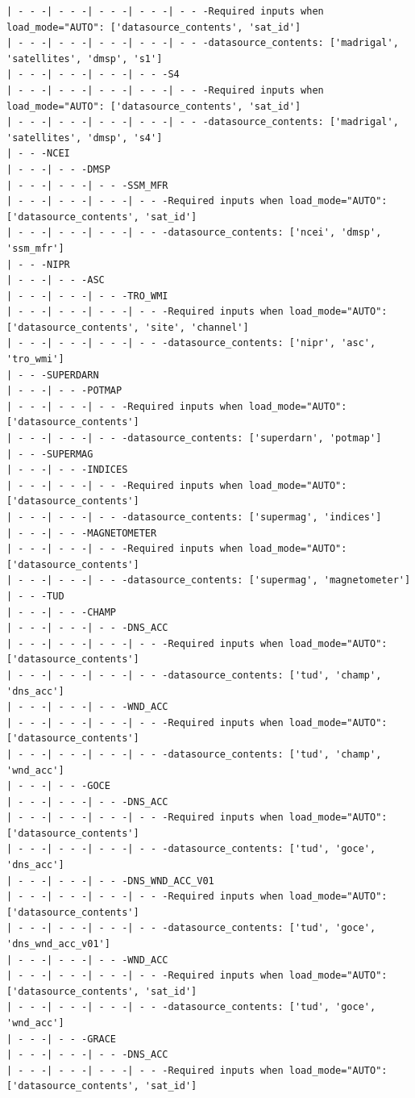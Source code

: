 \begin{verbatim}
| - - -| - - -| - - -| - - -| - - -Required inputs when load_mode="AUTO": ['datasource_contents', 'sat_id']
| - - -| - - -| - - -| - - -| - - -datasource_contents: ['madrigal', 'satellites', 'dmsp', 's1']
| - - -| - - -| - - -| - - -S4
| - - -| - - -| - - -| - - -| - - -Required inputs when load_mode="AUTO": ['datasource_contents', 'sat_id']
| - - -| - - -| - - -| - - -| - - -datasource_contents: ['madrigal', 'satellites', 'dmsp', 's4']
| - - -NCEI
| - - -| - - -DMSP
| - - -| - - -| - - -SSM_MFR
| - - -| - - -| - - -| - - -Required inputs when load_mode="AUTO": ['datasource_contents', 'sat_id']
| - - -| - - -| - - -| - - -datasource_contents: ['ncei', 'dmsp', 'ssm_mfr']
| - - -NIPR
| - - -| - - -ASC
| - - -| - - -| - - -TRO_WMI
| - - -| - - -| - - -| - - -Required inputs when load_mode="AUTO": ['datasource_contents', 'site', 'channel']
| - - -| - - -| - - -| - - -datasource_contents: ['nipr', 'asc', 'tro_wmi']
| - - -SUPERDARN
| - - -| - - -POTMAP
| - - -| - - -| - - -Required inputs when load_mode="AUTO": ['datasource_contents']
| - - -| - - -| - - -datasource_contents: ['superdarn', 'potmap']
| - - -SUPERMAG
| - - -| - - -INDICES
| - - -| - - -| - - -Required inputs when load_mode="AUTO": ['datasource_contents']
| - - -| - - -| - - -datasource_contents: ['supermag', 'indices']
| - - -| - - -MAGNETOMETER
| - - -| - - -| - - -Required inputs when load_mode="AUTO": ['datasource_contents']
| - - -| - - -| - - -datasource_contents: ['supermag', 'magnetometer']
| - - -TUD
| - - -| - - -CHAMP
| - - -| - - -| - - -DNS_ACC
| - - -| - - -| - - -| - - -Required inputs when load_mode="AUTO": ['datasource_contents']
| - - -| - - -| - - -| - - -datasource_contents: ['tud', 'champ', 'dns_acc']
| - - -| - - -| - - -WND_ACC
| - - -| - - -| - - -| - - -Required inputs when load_mode="AUTO": ['datasource_contents']
| - - -| - - -| - - -| - - -datasource_contents: ['tud', 'champ', 'wnd_acc']
| - - -| - - -GOCE
| - - -| - - -| - - -DNS_ACC
| - - -| - - -| - - -| - - -Required inputs when load_mode="AUTO": ['datasource_contents']
| - - -| - - -| - - -| - - -datasource_contents: ['tud', 'goce', 'dns_acc']
| - - -| - - -| - - -DNS_WND_ACC_V01
| - - -| - - -| - - -| - - -Required inputs when load_mode="AUTO": ['datasource_contents']
| - - -| - - -| - - -| - - -datasource_contents: ['tud', 'goce', 'dns_wnd_acc_v01']
| - - -| - - -| - - -WND_ACC
| - - -| - - -| - - -| - - -Required inputs when load_mode="AUTO": ['datasource_contents', 'sat_id']
| - - -| - - -| - - -| - - -datasource_contents: ['tud', 'goce', 'wnd_acc']
| - - -| - - -GRACE
| - - -| - - -| - - -DNS_ACC
| - - -| - - -| - - -| - - -Required inputs when load_mode="AUTO": ['datasource_contents', 'sat_id']

\end{verbatim}
